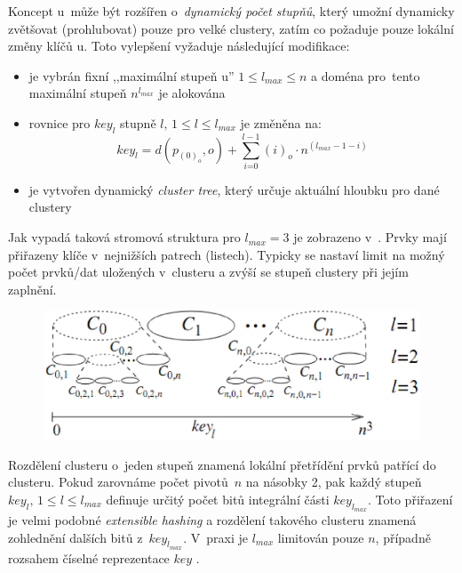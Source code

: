 Koncept \MIndex u~může být rozšířen o~\emph{dynamický počet stupňů},
který umožní  dynamicky zvětšovat (prohlubovat)
pouze pro velké clustery, zatím co 
požaduje pouze lokální změny klíčů \MIndex u. Toto vylepšení vyžaduje
následující modifikace:
\begin{itemize}
\item je vybrán fixní ,,maximální stupeň \MIndex u'' $1\leq l_{max}\leq n$
a doména pro~tento maximální stupeň $n^{l_{max}}$ je alokována
\item rovnice  pro $key_{l}$ stupně $l,\,1\leq l\leq l_{max}$
je změněna na:
\begin{equation}
key_{l}=d(p_{(0)_{o}},o)+\sum_{i\text{=0}}^{l-1}(i)_{o}\cdot n{}^{(l_{max}-1-i)}\label{eq:M-Index-key-max-level}
\end{equation}

\item je vytvořen dynamický \emph{cluster tree}, který určuje aktuální hloubku
pro dané \MIndex clustery
\end{itemize}
Jak vypadá taková stromová struktura pro $l_{max}=3$ je zobrazeno
v~\@. Prvky mají přiřazeny
klíče v~nejnižších patrech (listech). Typicky se nastaví limit na
možný počet prvků/dat uložených v~clusteru a zvýší se stupeň clustery
při jejím zaplnění.

\begin{figure}[t]


\centering{}\includegraphics[scale=0.5]{m-index-dynamic-cluster}\caption{\label{fig:Dynamic-Cluster-Tree}}
\end{figure}


Rozdělení clusteru o~jeden stupeň znamená lokální přetřídění prvků
patřící do clusteru\@. Pokud zarovnáme počet pivotů~$n$ na násobky
2, pak každý stupeň $key_{l},\,1\leq l\leq l_{max}$ definuje určitý
počet bitů integrální části $key_{l_{max}}$\@. Toto přiřazení je
velmi podobné \emph{extensible hashing}\cite{Fagin:1979:EHF:320083.320092}
a rozdělení takového clusteru znamená zohlednění dalších bitů z~$key_{l_{max}}$\@.
V~praxi je $l_{max}$ limitován pouze $n$, případně rozsahem číselné
reprezentace $key$ \@.


